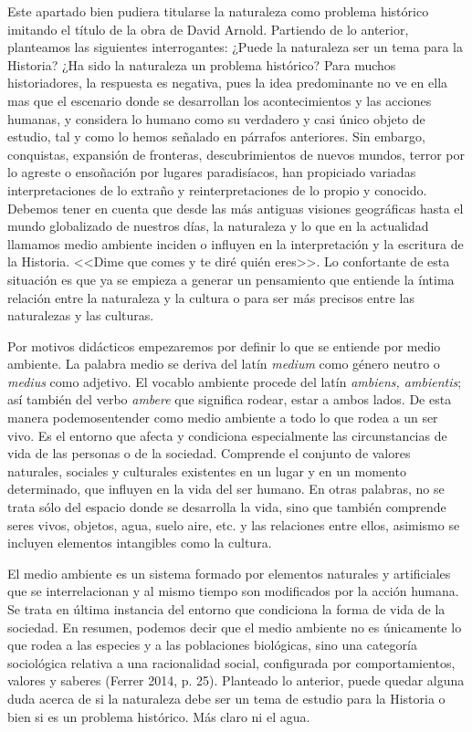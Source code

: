 Este apartado bien pudiera titularse la naturaleza como problema 
histórico imitando el título de la obra de David Arnold. Partiendo de 
lo anterior, planteamos las siguientes interrogantes: ¿Puede la 
naturaleza ser un tema para la Historia? ¿Ha sido la naturaleza un 
problema histórico? Para muchos historiadores, la respuesta es 
negativa, pues la idea predominante no ve en ella mas que el escenario 
donde se desarrollan los acontecimientos y las acciones humanas, y 
considera lo humano como su verdadero y casi único objeto de estudio, 
tal y como lo hemos señalado en párrafos anteriores. Sin embargo, 
conquistas, expansión de fronteras, descubrimientos de nuevos mundos, 
terror por lo agreste o ensoñación por lugares paradisíacos, han 
propiciado variadas interpretaciones de lo extraño y reinterpretaciones 
de lo propio y conocido. Debemos tener en cuenta que desde las más 
antiguas visiones geográficas hasta el mundo globalizado de nuestros 
días, la naturaleza y lo que en la actualidad llamamos medio ambiente 
inciden o influyen en la interpretación y la escritura de la Historia. 
<<Dime que comes y te diré quién eres>>. Lo confortante de esta situación 
es que ya se empieza a generar un pensamiento que entiende la íntima 
relación entre la naturaleza y la cultura o para ser más precisos entre 
las naturalezas y las culturas.

Por motivos didácticos empezaremos por definir lo que se entiende por 
medio ambiente. La palabra medio se deriva del latín \textit{medium} 
como género neutro o \textit{medius} como adjetivo. El vocablo ambiente 
procede del latín \textit{ambiens, ambientis}; así también del verbo 
\textit{ambere} que significa rodear, estar a ambos lados. De esta 
manera podemos\linebreak entender como medio ambiente a todo lo que rodea a un 
ser vivo. Es el entorno que afecta y condiciona especialmente las 
circunstancias de vida de las personas o de la sociedad. Comprende el 
conjunto de valores naturales, sociales y culturales existentes en un 
lugar y en un momento determinado, que influyen en la vida del ser 
humano. En otras palabras, no se trata sólo del espacio donde se 
desarrolla la vida, sino que también comprende seres vivos, objetos, 
agua, suelo aire, etc. y las relaciones entre ellos, asimismo se 
incluyen elementos intangibles como la cultura.

El medio ambiente es un sistema formado por elementos naturales y 
artificiales que se interrelacionan y al mismo tiempo son modificados 
por la acción humana. Se trata en última instancia del entorno que 
condiciona la forma de vida de la sociedad. En resumen, podemos decir 
que el medio ambiente no es únicamente lo que rodea a las especies y a 
las poblaciones biológicas, sino una categoría sociológica relativa a 
una racionalidad social, configurada por comportamientos, valores y 
saberes (Ferrer 2014, p. 25).  Planteado lo anterior, puede quedar alguna 
duda acerca de si la naturaleza debe ser un tema de estudio para la 
Historia o bien si es un problema histórico. Más claro ni el agua.

